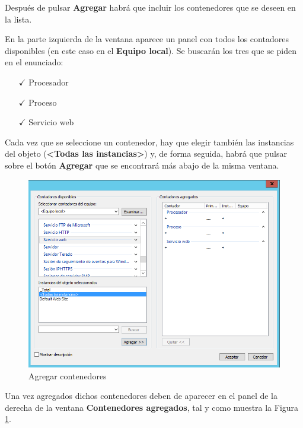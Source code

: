 	Después de pulsar \textbf{Agregar} habrá que incluir los contenedores que se deseen en la lista. 
	
	En la parte izquierda de la ventana aparece un panel con todos los contadores disponibles (en este caso en el \textbf{Equipo local}). Se buscarán los tres que se piden en el enunciado:
	
	\begin{itemize}
		\item [$ \checkmark $] Procesador 
		\item [$ \checkmark $] Proceso
		\item [$ \checkmark $] Servicio web
	\end{itemize}

	Cada vez que se seleccione un contenedor, hay que elegir también las instancias del objeto (\textbf{<Todas las instancias>}) y, de forma seguida, habrá que pulsar sobre el botón \textbf{Agregar} que se encontrará más abajo de la misma ventana.
	
	\begin{figure}[H] %
		\centering
		\includegraphics[scale=0.55]{figuras/figura13.png} 
		\caption{Agregar contenedores} 
		\label{fig:figura13}
	\end{figure}
	
	Una vez agregados dichos contenedores deben de aparecer en el panel de la derecha de la ventana \textbf{Contenedores agregados}, tal y como muestra la Figura \ref{fig:figura13}.
	
